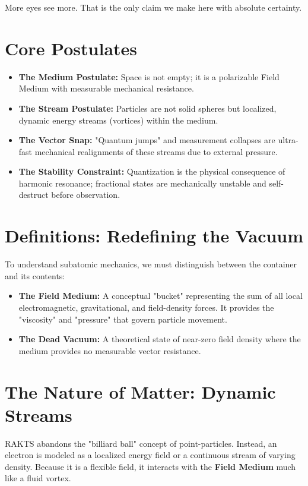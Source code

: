 \documentclass[reprint,amsmath,amssymb,aps,prd,twocolumn]{revtex4-2}
\begin{document}
More eyes see more. That is the only claim we make here with absolute certainty.

\section{Core Postulates}
\begin{itemize}
    \item \textbf{The Medium Postulate:} Space is not empty; it is a polarizable Field Medium with measurable mechanical resistance.
    \item \textbf{The Stream Postulate:} Particles are not solid spheres but localized, dynamic energy streams (vortices) within the medium.
    \item \textbf{The Vector Snap:} "Quantum jumps" and measurement collapses are ultra-fast mechanical realignments of these streams due to external pressure.
    \item \textbf{The Stability Constraint:} Quantization is the physical consequence of harmonic resonance; fractional states are mechanically unstable and self-destruct before observation.
\end{itemize}

\section{Definitions: Redefining the Vacuum}
To understand subatomic mechanics, we must distinguish between the container and its contents:

\begin{itemize}
    \item \textbf{The Field Medium:} A conceptual "bucket" representing the sum of all local electromagnetic, gravitational, and field-density forces. It provides the "viscosity" and "pressure" that govern particle movement.
    \item \textbf{The Dead Vacuum:} A theoretical state of near-zero field density where the medium provides no measurable vector resistance.
\end{itemize}

\section{The Nature of Matter: Dynamic Streams}
RAKTS abandons the "billiard ball" concept of point-particles. Instead, an electron is modeled as a localized energy field or a continuous stream of varying density. Because it is a flexible field, it interacts with the \textbf{Field Medium} much like a fluid vortex. 
\end{document}
